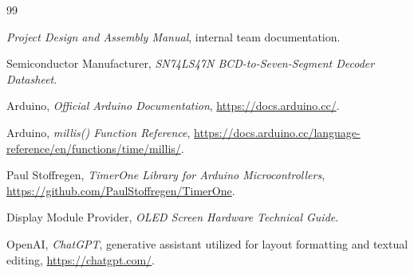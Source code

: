 \documentclass[12pt,letterpaper]{article}
\begin{document}
\clearpage
\begin{thebibliography}{99}

\textit{Project Design and Assembly Manual}, internal team documentation.

Semiconductor Manufacturer,
\textit{SN74LS47N BCD-to-Seven-Segment Decoder Datasheet}.

Arduino,
\textit{Official Arduino Documentation},
\url{https://docs.arduino.cc/}.

Arduino,
\textit{millis() Function Reference},
\url{https://docs.arduino.cc/language-reference/en/functions/time/millis/}.

Paul Stoffregen,
\textit{TimerOne Library for Arduino Microcontrollers},
\url{https://github.com/PaulStoffregen/TimerOne}.

Display Module Provider,
\textit{OLED Screen Hardware Technical Guide}.

OpenAI,
\textit{ChatGPT}, generative assistant utilized for layout formatting and textual editing,
\url{https://chatgpt.com/}.

\end{thebibliography}
\end{document}

